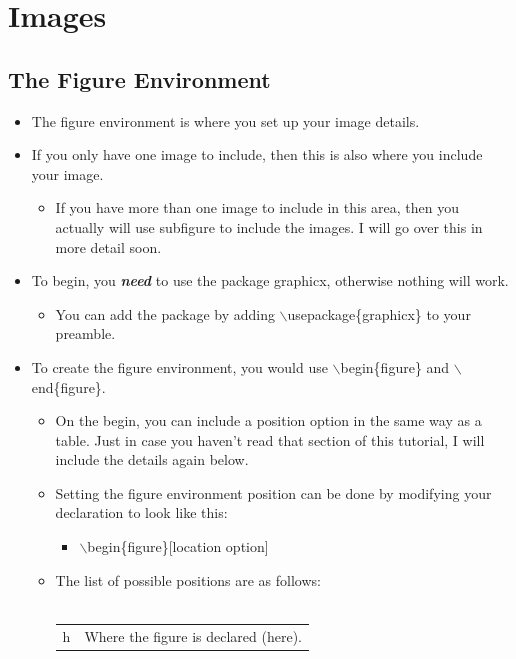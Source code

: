 \documentclass{article}
\begin{document}
	\section{Images}
		\subsection{The Figure Environment}
			\begin{itemize}
				\item The figure environment is where you set up your image details.
				\item If you only have one image to include, then this is also where you include your image.
				\begin{itemize}
					\item If you have more than one image to include in this area, then you actually will use subfigure to include the images. I will go over this in more detail soon.
				\end{itemize}
				\item To begin, you \textbf{\textit{need}} to use the package graphicx, otherwise nothing will work.
				\begin{itemize}
					\item You can add the package by adding $\backslash$usepackage\{graphicx\} to your preamble.
				\end{itemize}
				\item To create the figure environment, you would use $\backslash$begin\{figure\} and $\backslash$end\{figure\}.
				\begin{itemize}
					\item On the begin, you can include a position option in the same way as a table. Just in case you haven\rq{}t read that section of this tutorial, I will include the details again below.
					\item Setting the figure environment position can be done by modifying your declaration to look like this:
						\begin{itemize}
							\item $\backslash$begin\{figure\}[location option]
						\end{itemize}
					\item The list of possible positions are as follows:\\\\
					\def\arraystretch{1.4}
					\begin{tabularx}{\textwidth}{| l | X |}
						\hline
						h & Where the figure is declared (here).\\

\end{tabularx}
\end{itemize}
\end{itemize}
\end{document}
